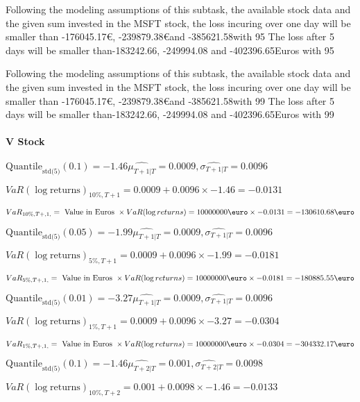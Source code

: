 Following the modeling assumptions of this subtask, the available stock data and the given sum invested in the MSFT stock, the loss incuring over one day will be smaller than -176045.17\euro, -239879.38\euro and -385621.58\euroEuros with 95%
The loss after 5 days will be smaller than-183242.66, -249994.08 and -402396.65Euros with 95%
 

Following the modeling assumptions of this subtask, the available stock data and the given sum invested in the MSFT stock, the loss incuring over one day will be smaller than -176045.17\euro, -239879.38\euro and -385621.58\euroEuros with 99%
The loss after 5 days will be smaller than-183242.66, -249994.08 and -402396.65Euros with 99%

\paragraph{V Stock}


$\text{Quantile}_\text{std(5)}(0.1) = -1.46$$\hat{\mu_{T+1|T}} = 0.0009, \hat{\sigma_{T+1|T}} = 0.0096$

$VaR(\log \text{returns})_{10\%, T + 1} = 0.0009 + 0.0096\times-1.46 = -0.0131$

$VaR_{10\%, T + ,1,} = \text{ Value in Euros } \times VaR(\log returns) = 10 000 000 \text{\euro} \times-0.0131 = -130610.68 \text{\euro}$


$\text{Quantile}_\text{std(5)}(0.05) = -1.99$$\hat{\mu_{T+1|T}} = 0.0009, \hat{\sigma_{T+1|T}} = 0.0096$

$VaR(\log \text{returns})_{5\%, T + 1} = 0.0009 + 0.0096\times-1.99 = -0.0181$

$VaR_{5\%, T + ,1,} = \text{ Value in Euros } \times VaR(\log returns) = 10 000 000 \text{\euro} \times-0.0181 = -180885.55 \text{\euro}$


$\text{Quantile}_\text{std(5)}(0.01) = -3.27$$\hat{\mu_{T+1|T}} = 0.0009, \hat{\sigma_{T+1|T}} = 0.0096$

$VaR(\log \text{returns})_{1\%, T + 1} = 0.0009 + 0.0096\times-3.27 = -0.0304$

$VaR_{1\%, T + ,1,} = \text{ Value in Euros } \times VaR(\log returns) = 10 000 000 \text{\euro} \times-0.0304 = -304332.17 \text{\euro}$


$\text{Quantile}_\text{std(5)}(0.1) = -1.46$$\hat{\mu_{T+2|T}} = 0.001, \hat{\sigma_{T+2|T}} = 0.0098$

$VaR(\log \text{returns})_{10\%, T + 2} = 0.001 + 0.0098\times-1.46 = -0.0133$

